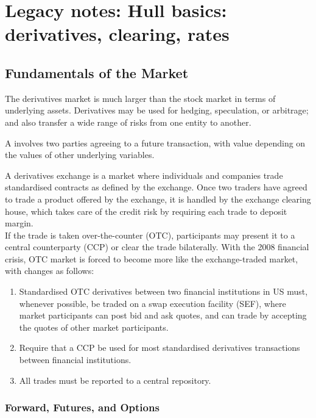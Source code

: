 \documentclass[a4paper,oneside,openany]{book}
\begin{document}
\chapter*{Legacy notes: Hull basics: derivatives, clearing, rates}

\section*{Fundamentals of the Market}

The derivatives market is much larger than the stock market in terms of underlying assets. Derivatives may be used for hedging, speculation, or arbitrage; and also transfer a wide range of risks from one entity to another.

\begin{definition} A  involves two parties agreeing to a future transaction, with value depending on the values of other underlying variables.
\end{definition}

A derivatives exchange is a market where individuals and companies trade standardised contracts as defined by the exchange. Once two traders have agreed to trade a product offered by the exchange, it is handled by the exchange clearing house, which takes care of the credit risk by requiring each trade to deposit margin.\\

If the trade is taken over-the-counter (OTC), participants may present it to a central counterparty (CCP) or clear the trade bilaterally. With the 2008 financial crisis, OTC market is forced to become more like the exchange-traded market, with changes as follows:
\begin{enumerate}[label=\roman*.]
\setlength{\itemsep}{0pt}
\item Standardised OTC derivatives between two financial institutions in US must, whenever possible, be traded on a swap execution facility (SEF), where market participants can post bid and ask quotes, and can trade by accepting the quotes of other market participants.
\item Require that a CCP be used for most standardised derivatives transactions between financial institutions.
\item All trades must be reported to a central repository.
\end{enumerate}

\subsection{Forward, Futures, and Options}
\end{document}
